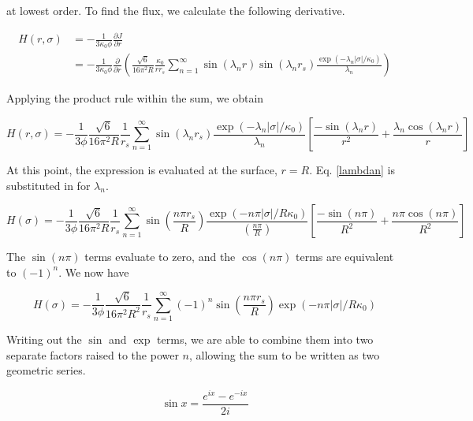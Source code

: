 \documentclass[onecolumn]{aastex63}
\begin{document}
at lowest order. To find the flux, we calculate the following derivative.

\begin{equation}
    \begin{split}
    H(r, \sigma) &= - \frac{1}{3\kappa_0 \phi}\frac{\partial J}{\partial r}\\
    &= - \frac{1}{3\kappa_0 \phi}\frac{\partial}{\partial r}\left(\frac{\sqrt{6}}{16 \pi^2 R} \frac{\kappa_0}{rr_s} \sum_{n=1}^{\infty}\sin(\lambda_n r) \sin(\lambda_n r_s) \frac{\exp{(-\lambda_n |\sigma|/\kappa_0)}}{\lambda_n}\right)
    \end{split}
\end{equation}

Applying the product rule within the sum, we obtain

\begin{equation}
    H(r, \sigma) = - \frac{1}{3 \phi} \frac{\sqrt{6}}{16 \pi^2 R} \frac{1}{r_s} \sum_{n=1}^{\infty} \sin(\lambda_n r_s) \frac{\exp{(-\lambda_n |\sigma|/\kappa_0)}}{\lambda_n} \left[ \frac{-\sin(\lambda_n r)}{r^2} + \frac{\lambda_n \cos(\lambda_n r)}{r}\right]
\end{equation}

At this point, the expression is evaluated at the surface, $r=R$. Eq. \ref{lambdan} is substituted in for $\lambda_n$.

\begin{equation}
    H(\sigma) = - \frac{1}{3 \phi} \frac{\sqrt{6}}{16 \pi^2 R} \frac{1}{r_s} \sum_{n=1}^{\infty} \sin{\left(\frac{n\pi r_s}{R}\right)} \frac{\exp{(-n \pi |\sigma|/R\kappa_0)}}{\left(\frac{n\pi}{R}\right)} \left[ \frac{-\sin(n \pi)}{R^2} + \frac{n \pi \cos(n \pi)}{R^2}\right]
\end{equation}

The $\sin(n\pi)$ terms evaluate to zero, and the $\cos(n\pi)$ terms are equivalent to $(-1)^n$. We now have

\begin{equation}
    H(\sigma) = - \frac{1}{3 \phi} \frac{\sqrt{6}}{16 \pi^2 R^2} \frac{1}{r_s} \sum_{n=1}^{\infty} (-1)^n \sin{\left(\frac{n\pi r_s}{R}\right)} \exp{(-n \pi |\sigma|/R\kappa_0)}
\end{equation}

Writing out the $\sin$ and $\exp$ terms, we are able to combine them into two separate factors raised to the power $n$, allowing the sum to be written as two geometric series.

\begin{equation}
    \sin{x} = \frac{e^{ix}-e^{-ix}}{2i}
\end{equation}
\end{document}
